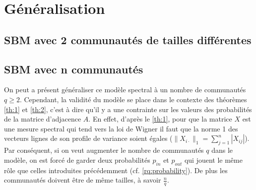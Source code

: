 \section{Généralisation}
\subsection{SBM avec 2 communautés de tailles différentes}

\subsection{SBM avec n communautés}

On peut a présent généraliser ce modèle spectral à un nombre de communautés $q \geq 2$.
Cependant, la validité du modèle se place dans le contexte des théorèmes \ref{th:1} et \ref{th:2}, c'est à dire qu'il y a une contrainte sur les valeurs des probabilités de la matrice d'adjacence $A$.
En effet, d'après le \autoref{th:1}, pour que la matrice $X$ est une mesure spectral qui tend vers la loi de Wigner il faut que la norme 1 des vecteurs lignes de son profile de variance soient égales ($\parallel X_{i \cdot} \parallel_1 = \sum_{j=1}^{n}|X_{ij}|$).
Par conséquent, si on veut augmenter le nombre de communautés $q$ dans le modèle, on est forcé de garder deux probabilités $p_{in}$ et $p_{out}$ qui jouent le même rôle que celles introduites précédemment (cf. \ref{rq:probability}).
De plus les communautés doivent être de même tailles, à savoir $\frac{n}{q}$.
